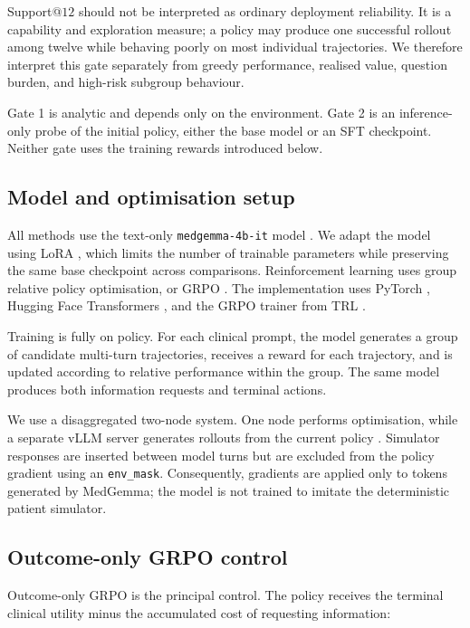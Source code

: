 \documentclass{article}
\begin{document}
Support@$12$ should not be interpreted as ordinary deployment reliability. It is
a capability and exploration measure; a policy may produce one successful rollout
among twelve while behaving poorly on most individual trajectories. We therefore
interpret this gate separately from greedy performance, realised value, question
burden, and high-risk subgroup behaviour.

Gate 1 is analytic and depends only on the environment. Gate 2 is an inference-only
probe of the initial policy, either the base model or an SFT checkpoint. Neither
gate uses the training rewards introduced below.

\subsection{Model and optimisation setup}
\label{subsec:model-setup}

All methods use the text-only \texttt{medgemma-4b-it} model
\citep{saab2025medgemma}. We adapt the model using LoRA
\citep{hu2022lora}, which limits the number of trainable parameters while preserving
the same base checkpoint across comparisons. Reinforcement learning uses group
relative policy optimisation, or GRPO \citep{shao2024deepseekmath}. The implementation
uses PyTorch \citep{paszke2019pytorch}, Hugging Face Transformers
\citep{wolf2020transformers}, and the GRPO trainer from TRL \citep{vonwerra2020trl}.

Training is fully on policy. For each clinical prompt, the model generates a group
of candidate multi-turn trajectories, receives a reward for each trajectory, and
is updated according to relative performance within the group. The same model
produces both information requests and terminal actions.

We use a disaggregated two-node system. One node performs optimisation, while a
separate vLLM server generates rollouts from the current policy
\citep{kwon2023vllm}. Simulator responses
are inserted between model turns but are excluded from the policy gradient using
an \texttt{env\_mask}. Consequently, gradients are applied only to tokens generated
by MedGemma; the model is not trained to imitate the deterministic patient
simulator.

\subsection{Outcome-only GRPO control}
\label{subsec:plain-grpo}

Outcome-only GRPO is the principal control. The policy receives the terminal
clinical utility minus the accumulated cost of requesting information:
\end{document}
